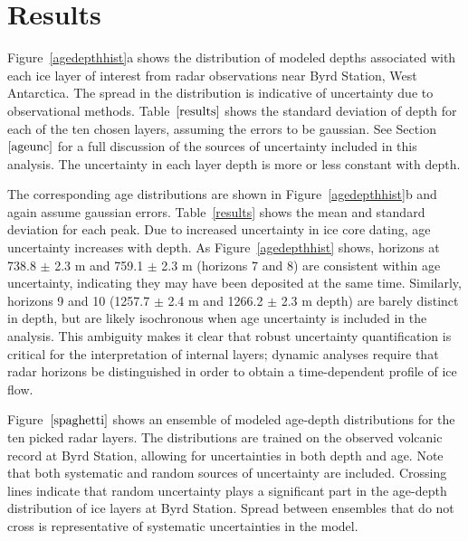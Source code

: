 \documentclass[12pt]{article}
\begin{document}
\section{Results}


Figure~\ref{agedepthhist}a shows the distribution of modeled depths associated with each ice layer of interest from radar observations near Byrd Station, West Antarctica. The spread in the distribution is indicative of uncertainty due to observational methods. Table~$\ref{results}$ shows the standard deviation of depth for each of the ten chosen layers, assuming the errors to be gaussian. See Section~$\ref{ageunc}$ for a full discussion of the sources of uncertainty included in this analysis. The uncertainty in each layer depth is more or less constant with depth. 

The corresponding age distributions are shown in Figure~\ref{agedepthhist}b and again assume gaussian errors. Table~\ref{results} shows the mean and standard deviation for each peak. Due to increased uncertainty in ice core dating, age uncertainty increases with depth. As Figure~\ref{agedepthhist} shows, horizons at 738.8 $\pm$ 2.3 m and 759.1 $\pm$ 2.3 m (horizons 7 and 8) are consistent within age uncertainty, indicating they may have been deposited at the same time. Similarly, horizons 9 and 10 (1257.7 $\pm$ 2.4 m and 1266.2 $\pm$ 2.3 m depth) are barely distinct in depth, but are likely isochronous when age uncertainty is included in the analysis.  This ambiguity makes it clear that robust uncertainty quantification is critical for the interpretation of internal layers; dynamic analyses require that radar horizons be distinguished in order to obtain a time-dependent profile of ice flow. 

Figure~$\ref{spaghetti}$ shows an ensemble of modeled age-depth distributions for the ten picked radar layers. The distributions are trained on the observed volcanic record at Byrd Station, allowing for uncertainties in both depth and age. Note that both systematic and random sources of uncertainty are included. Crossing lines indicate that random uncertainty plays a significant part in the age-depth distribution of ice layers at Byrd Station. Spread between ensembles that do not cross is representative of systematic uncertainties in the model. 
\end{document}
